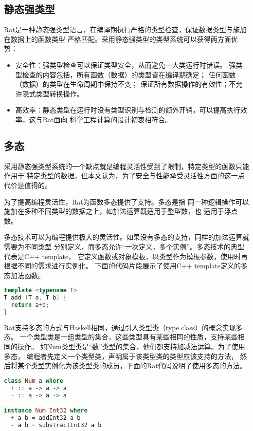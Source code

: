 \subsection{静态强类型}
Rat是一种静态强类型语言，在编译期执行严格的类型检查，保证数据类型与施加在数据上的函数类型
严格匹配。采用静态强类型的类型系统可以获得两方面优势：
\begin{itemize}
  \item 安全性：强类型检查可以保证类型安全，从而避免一大类运行时错误。
    强类型检查的内容包括，所有函数（数据）的类型皆在编译期确定；
    任何函数（数据）的类型在生命周期中保持不变；
    保证所有数据操作的有效性；不允许隐式类型转换操作。
  \item 高效率：静态类型在运行时没有类型识别与检测的额外开销，可以提高执行效率，这与Rat面向
    科学工程计算的设计初衷相符合。
\end{itemize}

\subsection{多态}
采用静态强类型系统的一个缺点就是编程灵活性受到了限制，特定类型的函数只能作用于
特定类型的数据。但本文认为，为了安全与性能承受灵活性方面的这一点代价是值得的。

为了提高编程灵活性，Rat为函数多态提供了支持。多态是指
同一种逻辑操作可以施加在多种不同类型的数据之上，如加法运算既适用于整型数，也
适用于浮点数。

多态技术可以为编程提供极大的灵活性。如果没有多态的支持，同样的加法运算就需要为不同类型
分别定义，而多态允许“一次定义，多个实例”。多态技术的典型代表是C++ template，
它定义函数或对象模板，以类型作为模板参数，使用时再根据不同的需求进行实例化。
下面的代码片段展示了使用C++ template定义的多态加法函数。
\begin{lstlisting}[language=C++]
template <typename T>
T add (T a, T b) {
  return a+b;
}
\end{lstlisting}

Rat支持多态的方式与Haskell相同，通过引入类型类（type class）的概念实现多态。
一个类型类是一组类型的集合，这些类型具有某些相同的性质，支持某些相同的操作。
如Num类型类是“数”类型的集合，他们都支持加减法运算。为了使用多态，
编程者先定义一个类型类，声明属于该类型类的类型应该支持的方法，
然后将某个类型实例化为该类型类的成员，下面的Rat代码说明了使用多态的方法。
\begin{lstlisting}[language=Haskell]
class Num a where
  + :: a -> a -> a
  - :: a -> a -> a

instance Num Int32 where
  + a b = addInt32 a b
  - a b = substractInt32 a b
\end{lstlisting}

